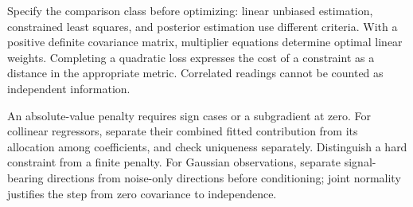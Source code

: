 Specify the comparison class before optimizing: linear unbiased estimation, constrained least squares, and posterior estimation use different criteria. With a positive definite covariance matrix, multiplier equations determine optimal linear weights. Completing a quadratic loss expresses the cost of a constraint as a distance in the appropriate metric. Correlated readings cannot be counted as independent information.

An absolute-value penalty requires sign cases or a subgradient at zero. For collinear regressors, separate their combined fitted contribution from its allocation among coefficients, and check uniqueness separately. Distinguish a hard constraint from a finite penalty. For Gaussian observations, separate signal-bearing directions from noise-only directions before conditioning; joint normality justifies the step from zero covariance to independence.
\par\smallskip
